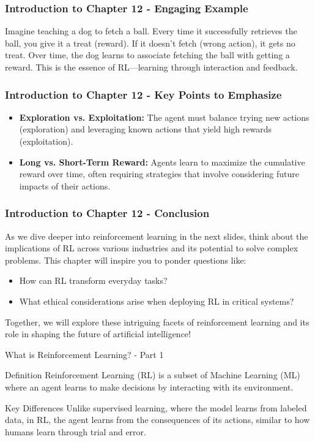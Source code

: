 \documentclass[aspectratio=169]{beamer}
\begin{document}
\begin{frame}[fragile]
    \frametitle{Introduction to Chapter 12 - Engaging Example}
    Imagine teaching a dog to fetch a ball. Every time it successfully retrieves the ball, you give it a treat (reward). If it doesn’t fetch (wrong action), it gets no treat. 
    Over time, the dog learns to associate fetching the ball with getting a reward. 
    This is the essence of RL—learning through interaction and feedback.
\end{frame}

\begin{frame}[fragile]
    \frametitle{Introduction to Chapter 12 - Key Points to Emphasize}
    \begin{itemize}
        \item \textbf{Exploration vs. Exploitation:} The agent must balance trying new actions (exploration) and leveraging known actions that yield high rewards (exploitation).
        \item \textbf{Long vs. Short-Term Reward:} Agents learn to maximize the cumulative reward over time, often requiring strategies that involve considering future impacts of their actions.
    \end{itemize}
\end{frame}

\begin{frame}[fragile]
    \frametitle{Introduction to Chapter 12 - Conclusion}
    As we dive deeper into reinforcement learning in the next slides, think about the implications of RL across various industries and its potential to solve complex problems. 
    This chapter will inspire you to ponder questions like: 
    \begin{itemize}
        \item How can RL transform everyday tasks?
        \item What ethical considerations arise when deploying RL in critical systems?
    \end{itemize}
    Together, we will explore these intriguing facets of reinforcement learning and its role in shaping the future of artificial intelligence!
\end{frame}

\begin{frame}[fragile]{What is Reinforcement Learning? - Part 1}
    \begin{block}{Definition}
        Reinforcement Learning (RL) is a subset of Machine Learning (ML) where an agent learns to make decisions by interacting with its environment. 
    \end{block}
    
    \begin{block}{Key Differences}
        Unlike supervised learning, where the model learns from labeled data, in RL, the agent learns from the consequences of its actions, similar to how humans learn through trial and error.
    \end{block}
\end{frame}
\end{document}
